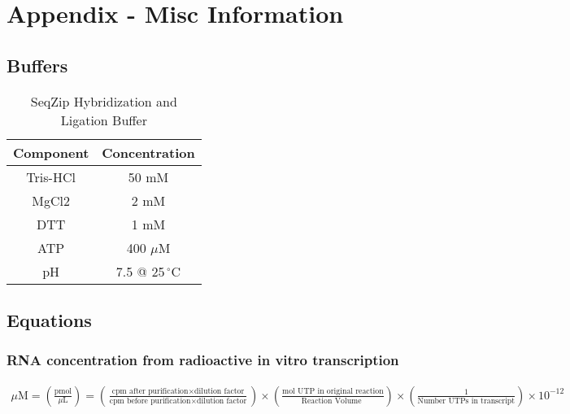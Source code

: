 \chapter{Appendix - Misc Information} \label{AppendixMisc:Appendix: Misc Info} 


\section{Buffers}\label{AppendixMisc:sec:Buffers}

  \renewcommand{\arraystretch}{1}
    \begin{table}[ht]
    \centering
      \begin{tabular}[c]{c|c}
      Component & Concentration \\
        \hline
      Tris-HCl  & 50 mM         \\
        \hline
      MgCl2     & 2 mM          \\
        \hline
      DTT       & 1 mM          \\
        \hline
      ATP       & 400 $\mu$M        \\
        \hline
      pH        & 7.5 @ 25$\,^{\circ}\mathrm{C}$   
      \end{tabular}
    \caption[SeqZip Hybridization and Ligation Buffer]
      {
      SeqZip Hybridization and Ligation Buffer
      }
    \label{AppendixMisc:tbl: Rnl2 Buffer}
    \end{table}

\section{Equations}\label{AppendixMisc:sec: Equations}

\subsection{RNA concentration from radioactive in vitro transcription}

{
  \tiny{
    \begin{eqnarray*}
    \mu \mbox{M} = \left( \frac{\mbox{pmol}}{\mu\mbox{L}}\right)
          = \left( \frac{\mbox{cpm after purification} \times \mbox{dilution factor}}{\mbox{cpm before purification} \times \mbox{dilution factor}} \right)
          \times \left( \frac{\mbox{mol UTP in original reaction}}{\mbox{Reaction Volume }} \right) \times \left( \frac{1}{\mbox{Number UTPs in transcript}} \right) \times 10^{-12} 
    \end{eqnarray*}
  }
}

